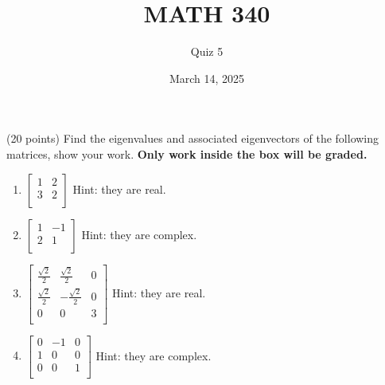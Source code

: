 \documentclass{exam}
\begin{document}
\title{MATH 340}
\author{Quiz 5}
\date{March 14, 2025}
\maketitle

(20 points) Find the eigenvalues and associated eigenvectors of the following
matrices, show your work. \textbf{Only work inside the box will be graded.}

\begin{enumerate}

	\item

				$\begin{bmatrix}
				1 & 2 \\
				3 & 2 \\
				\end{bmatrix}$
	Hint: they are real.

\vspace{0.1cm}
\begin{solutionorbox}[7cm]
\end{solutionorbox}


	\item

		$\begin{bmatrix}
		1 & -1 \\
		2 &  1 \\
		\end{bmatrix}$
	Hint: they are complex.

\vspace{0.1cm}
\begin{solutionorbox}[7cm]
\end{solutionorbox}

	\item

		$\begin{bmatrix}
		\frac{\sqrt{2}}{2} & \frac{\sqrt{2}}{2} & 0 \\
		\frac{\sqrt{2}}{2} & -\frac{\sqrt{2}}{2} & 0 \\
		0 & 0 & 3\\
		\end{bmatrix}$
	Hint: they are real.

\vspace{0.1cm}
\begin{solutionorbox}[9.5cm]
\end{solutionorbox}

	\item

		$\begin{bmatrix}
		0 & -1 & 0 \\
		1 & 0 & 0 \\
		0 & 0 & 1 \\
		\end{bmatrix}$
	Hint: they are complex.

\vspace{0.1cm}
\begin{solutionorbox}[9.5cm]
\end{solutionorbox}


\end{enumerate}
\end{document}

